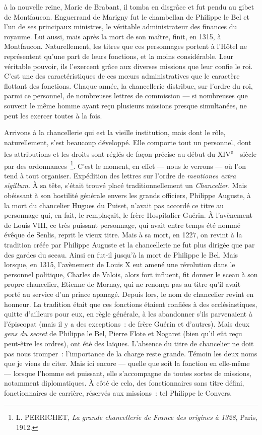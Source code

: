 \documentclass[french,twoside]{book} %
\begin{document}
\label{p38} à la nouvelle reine, Marie de Brabant, il tomba en disgrâce et fut pendu au gibet de Montfaucon. Enguerrand de Marigny fut le chambellan de Philippe le Bel et l’un de ses principaux ministres, le véritable administrateur des finances du royaume. Lui aussi, mais après la mort de son maître, finit, en 1315, à Montfaucon. Naturellement, les titres que ces personnages portent à l’Hôtel ne représentent qu’une part de leurs fonctions, et la moins considérable. Leur véritable pouvoir, ils l’exercent grâce aux diverses missions que leur confie le roi. C’est une des caractéristiques de ces mœurs administratives que le caractère flottant des fonctions. Chaque année, la chancellerie distribue, sur l’ordre du roi, parmi ce personnel, de nombreuses lettres de commission — si nombreuses que souvent le même homme ayant reçu plusieurs missions presque simultanées, ne peut les exercer toutes à la fois.\par
Arrivons à la chancellerie qui est la vieille institution, mais dont le rôle, naturellement, s’est beaucoup développé. Elle comporte tout un personnel, dont les attributions et les droits sont réglés de façon précise au début du XIV\textsuperscript{e}  siècle par des ordonnances \footnote{ L. PERRICHET, {\itshape La grande chancellerie de France des origines à 1328}, Paris, 1912.}. C’est le moment, en effet — nous le verrons — où l’on tend à tout organiser. Expédition des lettres sur l’ordre de \emph{mentiones extra sigillum}. À sa tête, s’était trouvé placé traditionnellement un \emph{Chancelier}. Mais obéissant à son hostilité générale envers les grands officiers, Philippe Auguste, à la mort du chancelier Hugues du Puiset, n’avait pas accordé ce titre au personnage qui, en fait, le remplaçait, le frère Hospitalier Guérin. À l’avènement de Louis VIII, ce très puissant personnage, qui avait entre temps été nommé évêque de Senlis, reprit le vieux titre. Mais à sa mort, en 1227, on revint à la tradition créée par Philippe Auguste et la chancellerie ne fut plus dirigée que par des gardes du sceau. Ainsi en fut-il jusqu’à la mort de Philippe le Bel. Mais lorsque, en 1315, l’avènement de Louis X eut amené une révolution dans le personnel politique, Charles de Valois, alors fort influent, fit donner le sceau à son propre chancelier, Etienne de Mornay, qui ne renonça pas au titre qu’il avait porté au service d’un prince apanagé. Depuis lors, le nom de chancelier revint en honneur. La tradition était que ces fonctions étaient confiées à des ecclésiastiques, quitte d’ailleurs pour eux, en règle générale, à les abandonner s’ils parvenaient à l’épiscopat (mais il y a des exceptions : de frère Guérin et d’autres). Mais deux \emph{gens du secret} de Philippe le Bel, Pierre Flote et Nogaret (bien qu’il eût reçu peut-être les ordres), ont été des laïques. L’absence du titre de chancelier ne doit pas nous tromper : l’importance de la charge reste grande. Témoin les deux noms que je viens de citer. Mais ici encore — quelle que soit la fonction en elle-même — lorsque l’homme est puissant, elle s’accompagne de toutes sortes de missions, notamment diplomatiques. À côté de cela, des fonctionnaires sans titre défini, fonctionnaires de carrière, réservés aux missions : tel Philippe le Convers.\par
\end{document}
